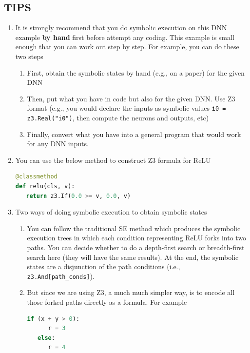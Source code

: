 \documentclass[oneside,11pt,dvipsnames]{book}
\numberwithin{equation}{section}
\theoremstyle{definition}
\theoremstyle{remark}
\begin{document}
\subsection{TIPS}

\begin{enumerate}[label=\arabic*.]
\item It is strongly recommend that you do symbolic execution on this DNN example \textbf{by hand} first before attempt any coding.  This example is small enough that you can work out step by step.  For example, you can do these two steps
    \begin{enumerate}[label=(\alph*)]
    \item First, obtain the symbolic states by hand (e.g., on a paper) for the given DNN
    \item Then, put what you have in code but also for the given DNN. Use Z3 format (e.g.,  you would declare the inputs as symbolic values \texttt{i0 = z3.Real("i0")}, then compute the neurons and outputs, etc)
    \item Finally, convert what you have into a general program that would work for any DNN inputs.
    \end{enumerate}

\item You can use the below method to construct Z3 formula for ReLU

\begin{lstlisting}[language=Python]
@classmethod
def relu(cls, v):
   return z3.If(0.0 >= v, 0.0, v)
\end{lstlisting}

\item Two ways of doing symbolic execution to obtain symbolic states
    \begin{enumerate}[label=(\alph*)]
    \item You can follow the traditional SE method which produces the symbolic execution trees in which each condition representing ReLU forks into two paths.  You can decide whether to do a depth-first search or breadth-first search here (they will have the same results). At the end, the symbolic states are a disjunction of the path conditions (i.e., \texttt{z3.And[path\_conds]}).
    \item But since we are using Z3, a much much simpler way, is to encode all those forked paths directly as a formula.  For example

\begin{lstlisting}[language=Python]
   if (x + y > 0):
      r = 3
   else:
      r = 4
\end{lstlisting}


\end{enumerate}
\end{enumerate}
\end{document}
